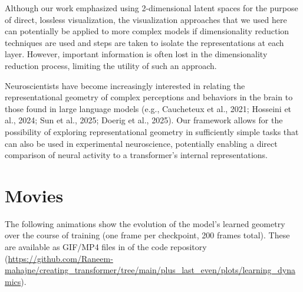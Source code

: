 \documentclass[
  11pt,
  a4paper,
]{article}
\begin{document}
Although our work emphasized using 2-dimensional latent spaces for the
purpose of direct, lossless visualization, the visualization approaches
that we used here can potentially be applied to more complex models if
dimensionality reduction techniques are used and steps are taken to
isolate the representations at each layer. However, important
information is often lost in the dimensionality reduction process,
limiting the utility of such an approach.

Neuroscientists have become increasingly interested in relating the
representational geometry of complex perceptions and behaviors in the
brain to those found in large language models (e.g., Caucheteux et al.,
2021; Hosseini et al., 2024; Sun et al., 2025; Doerig et al., 2025). Our
framework allows for the possibility of exploring representational
geometry in sufficiently simple tasks that can also be used in
experimental neuroscience, potentially enabling a direct comparison of
neural activity to a transformer's internal representations.

\section{Movies}\label{movies}

The following animations show the evolution of the model's learned
geometry over the course of training (one frame per checkpoint, 200
frames total). These are available as GIF/MP4 files in
\texttt{} of the
code repository
(\url{https://github.com/Raneem-mahajne/creating_transformer/tree/main/plus_last_even/plots/learning_dynamics}).

\noindent
\end{document}
